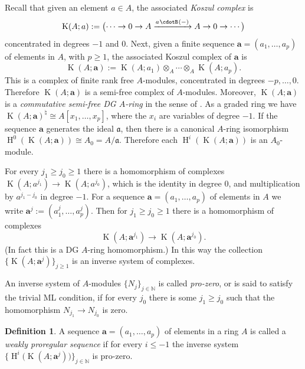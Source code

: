 \documentclass[10pt]{amsart}
\theoremstyle{definition}
\newtheorem{dfn}[equation]{Definition}
\numberwithin{equation}{section}
\newcommand{\xar}{\xrightarrow}
\newcommand{\opn}{\operatorname}
\newcommand{\cd}{\mspace{1.3mu}{\cdotB}\mspace{1.3mu}}
\newcommand{\mfrak}[1]{\mathfrak{#1}}
\renewcommand{\a}{\mfrak{a}}
\newcommand{\ba}{\bsym{a}}
\newcommand{\N}{\mathbb{N}}
\newcommand{\bsym}[1]{\boldsymbol{#1}}
\newcommand{\ot}{\otimes}
\begin{document}
Recall that given an element $a \in A$, the associated {\em Koszul complex} is
\begin{equation} \label{eqn:333}
\opn{K}(A; a) :=
\bigl( \cdots \to 0 \to A \xar{a \cd (-)} A \to 0 \to \cdots \bigr)
\end{equation}
concentrated in degrees $-1$ and $0$.
Next, given a finite sequence $\ba = (a_1, \ldots, a_p)$ of elements in $A$,
with $p \geq 1$,
the associated Koszul complex of $\ba$ is
\begin{equation} \label{eqn:334}
\opn{K}(A; \ba) :=
\opn{K}(A; a_1) \ot_{A} \cdots \ot_{A} \opn{K}(A; a_p) .
\end{equation}
This is a complex of finite rank free $A$-modules, concentrated in degrees
$-p, \ldots, 0$. Therefore $\opn{K}(A; \ba)$ is a semi-free complex of
$A$-modules.
Moreover, $\opn{K}(A; \ba)$ is a {\em commutative semi-free DG $A$-ring} in the
sense of \cite[Definition 3.11(1)]{Ye3}.
As a graded ring we have
$\opn{K}(A; \ba)^{\natural} \cong A[x_1, \ldots, x_p]$, where the $x_i$ are
variables of degree $-1$.
If the sequence $\ba$ generates the ideal $\a$, then there is a canonical
$A$-ring isomorphism
$\opn{H}^0(\opn{K}(A; \ba)) \cong A_0 = A / \a$.
Therefore each $\opn{H}^i(\opn{K}(A; \ba))$ is an $A_0$-module.

For every $j_1 \geq j_0 \geq 1$ there is a homomorphism of complexes
$\opn{K}(A; a^{j_1}) \to \opn{K}(A; a^{j_0})$,
which is the identity in degree $0$, and multiplication by
$a^{j_1 - j_0}$ in degree $-1$.
For a sequence $\ba = (a_1, \ldots, a_p)$ of elements in $A$
we write $\ba^j := (a_1^j, \ldots, a_p^j)$.
Then for $j_1 \geq j_0 \geq 1$ there is a homomorphism of complexes
\begin{equation} \label{eqn:275}
\opn{K}(A; \ba^{j_1}) \to \opn{K}(A; \ba^{j_0}) .
\end{equation}
(In fact this is a DG $A$-ring homomorphism.)
In this way the collection
$\{ \opn{K}(A; \ba^{j}) \}_{j \geq 1}$
is an inverse system of complexes.

An inverse system of $A$-modules
$\{ N_j \}_{j \in \N}$ is called {\em pro-zero}, or is said to satisfy the
trivial ML condition, if for every $j_0$ there is some
$j_1 \geq j_0$ such that the homomorphism $N_{j_1} \to N_{j_0}$ is zero.

\begin{dfn} \label{dfn:255}
A sequence $\ba = (a_1, \ldots, a_p)$ of elements in a ring $A$ is called a
{\em weakly proregular sequence} if for every $i \leq -1$ the inverse system
$\bigl\{ \opn{H}^i \bigl( \opn{K}(A; \ba^{j}) \bigr) \bigr\}_{j \in \N}$
is pro-zero.
\end{dfn}
\end{document}
